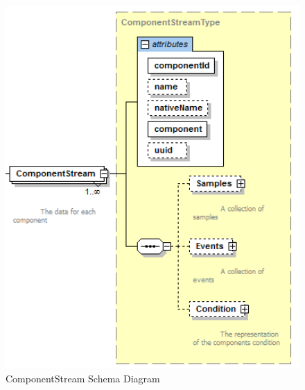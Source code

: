 \begin{figure}[ht]
  \centering
    \includegraphics[width=1.0\textwidth]{figures/ComponentStream Schema.png}
  \caption{ComponentStream Schema Diagram}
  \label{fig:ComponentStream Schema Diagram}
\end{figure}

\FloatBarrier


